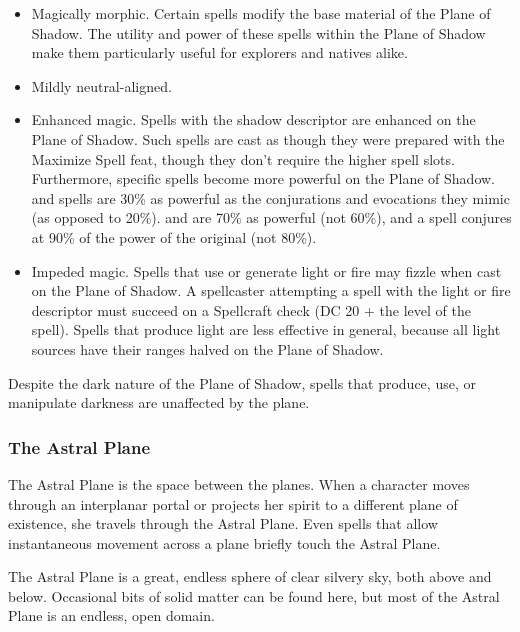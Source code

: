 \begin{itemize}
\item Magically morphic. Certain spells modify the base material of the Plane of Shadow. 
The utility and power of these spells within the Plane of Shadow make them particularly 
useful for explorers and natives alike.
\item Mildly neutral-aligned.
\item Enhanced magic. Spells with the shadow descriptor are enhanced on the Plane of 
Shadow. Such spells are cast as though they were prepared with the Maximize Spell 
feat, though they don't require the higher spell slots. Furthermore, specific spells become more powerful on the Plane of Shadow.  and  spells are 30\% as powerful as the conjurations and evocations they mimic (as opposed to 20\%).  and  are 70\% as powerful (not 60\%), and a  spell conjures at 90\% of the power of the original (not 80\%).
\item Impeded magic. Spells that use or generate light or fire may fizzle when cast on 
the Plane of Shadow. A spellcaster attempting a spell with the light or fire descriptor 
must succeed on a Spellcraft check (DC 20 + the level of the spell). Spells that 
produce light are less effective in general, because all light sources have their 
ranges halved on the Plane of Shadow.
\end{itemize}

Despite the dark nature of the Plane of Shadow, spells that produce, use, or manipulate 
darkness are unaffected by the plane.

\subsubsection{The Astral Plane}

The Astral Plane is the space between the planes. When a character moves through 
an interplanar portal or projects her spirit to a different plane of existence, 
she travels through the Astral Plane. Even spells that allow instantaneous movement 
across a plane briefly touch the Astral Plane.

The Astral Plane is a great, endless sphere of clear silvery sky, both above and 
below. Occasional bits of solid matter can be found here, but most of the Astral 
Plane is an endless, open domain.

